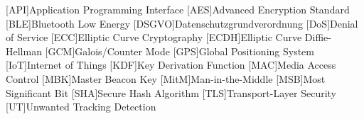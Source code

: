 \begin{acronym}[AAAAA]

    [API]{Application Programming Interface}
    [AES]{Advanced Encryption Standard}
    [BLE]{Bluetooth Low Energy}
    [DSGVO]{Datenschutzgrundverordnung}
    [DoS]{Denial of Service}
    [ECC]{Elliptic Curve Cryptography}
    [ECDH]{Elliptic Curve Diffie-Hellman}
    [GCM]{Galois/Counter Mode}
    [GPS]{Global Positioning System}
    [IoT]{Internet of Things}
    [KDF]{Key Derivation Function}
    [MAC]{Media Access Control}
    [MBK]{Master Beacon Key}
    [MitM]{Man-in-the-Middle}
    [MSB]{Most Significant Bit}
    [SHA]{Secure Hash Algorithm}
    [TLS]{Transport-Layer Security}
    [UT]{Unwanted Tracking Detection}
    
\end{acronym}